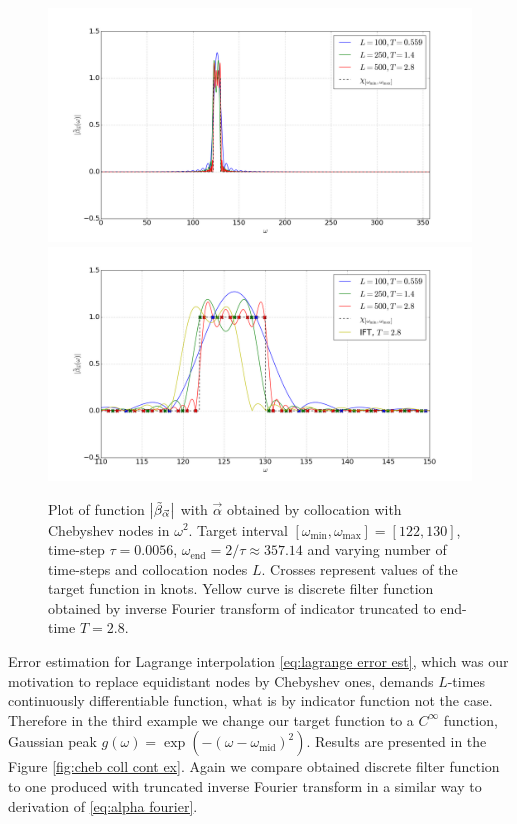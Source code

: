 \documentclass[a4paper,11pt,bibliography=totoc,listof=totoc,headinclude=true,cleardoublepage=empty,oneside]{scrbook}
\newcommand{\dffv}{\Tilde{\beta}_{\Vec{\alpha}}}
\newcommand{\e}{\mathrm{end}}
\begin{document}
\begin{figure}
    \centering
    \includegraphics[width=1\linewidth]{latex//images//cheb_coll/Figure_3.png}
    \includegraphics[width=1\linewidth]{latex//images//cheb_coll/Figure_4.png}
    \caption{Plot of function $\left|\dffv\right|$ with $\Vec{\alpha}$ obtained by collocation with Chebyshev nodes in $\omega^2$. Target interval $\left[\omega_{\min}, \omega_{\max} \right] = [122, 130]$, time-step $\tau = 0.0056$, $\omega_\e = 2/\tau \approx 357.14$ and varying number of time-steps and collocation nodes $L$. Crosses represent values of the target function in knots. Yellow curve is discrete filter function obtained by inverse Fourier transform of indicator truncated to end-time $T=2.8$.}
    \label{fig:cheb coll 2}
\end{figure}

Error estimation for Lagrange interpolation \eqref{eq:lagrange error est}, which was our motivation to replace equidistant nodes by Chebyshev ones, demands $L$-times continuously differentiable function, what is by indicator function not the case. Therefore in the third example we change our target function to a $C^\infty$ function, Gaussian peak $g(\omega) = \exp\left(-(\omega-\omega_{\mathrm{mid}})^2\right)$. Results are presented in the Figure \ref{fig:cheb coll cont ex}. Again we compare obtained discrete filter function to one produced with truncated inverse Fourier transform in a similar way to derivation of \eqref{eq:alpha fourier}. 
\end{document}
